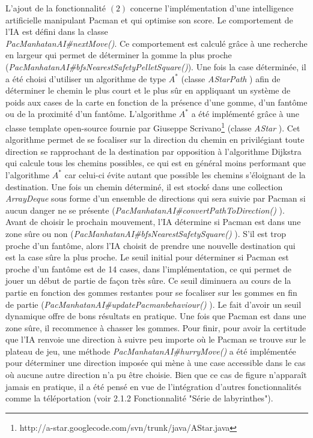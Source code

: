\documentclass[12pt, openany]{report}
\begin{document}
L'ajout de la fonctionnalité $(2)$ concerne l'implémentation d'une intelligence artificielle manipulant Pacman et qui optimise son score. Le comportement de l'IA est défini dans la classe\\
 \mbox{\textit{PacManhatanAI\#nextMove()}}. Ce comportement est calculé grâce à une recherche en largeur qui permet de déterminer la gomme la plus proche (\mbox{\textit{PacManhatanAI\#bfsNearestSafetyPelletSquare()}}). Une fois la case déterminée, il a été choisi d'utiliser un algorithme de type $A^*$ (classe \mbox{\textit{AStarPath}}
) afin de déterminer le chemin le plus court et le plus sûr en appliquant un système de poids aux cases de la carte en fonction de la présence d'une gomme, d'un fantôme ou de la proximité d'un fantôme. L'algorithme $A^*$ a été implémenté grâce à une classe template open-source fournie par Giuseppe Scrivano\footnote{http://a-star.googlecode.com/svn/trunk/java/AStar.java}
(classe \mbox{\textit{AStar}}
). Cet algorithme permet de se focaliser sur la direction du chemin en privilégiant toute direction se rapprochant de la destination par opposition à l'algorithme Dijkstra qui calcule tous les chemins possibles, ce qui est en général moins performant que l'algorithme $A^*$ car celui-ci évite autant que possible les chemins s'éloignant de la destination. Une fois un chemin déterminé, il est stocké dans une collection \textit{ArrayDeque} sous forme d'un ensemble de directions qui sera suivie par Pacman si aucun danger ne se présente (\mbox{\textit{PacManhatanAI\#convertPathToDirection()}}
). Avant de choisir le prochain mouvement, l'IA détermine si Pacman est dans une zone sûre ou non (\mbox{\textit{PacManhatanAI\#bfsNearestSafetySquare()}}
). S'il est trop proche d'un fantôme, alors l'IA choisit de prendre une nouvelle destination qui est la case sûre la plus proche. Le seuil initial pour déterminer si Pacman est proche d'un fantôme est de 14 cases, dans l'implémentation, ce qui permet de jouer un début de partie de façon très sûre. Ce seuil diminuera au cours de la partie en fonction des gommes restantes pour se focaliser sur les gommes en fin de partie (\mbox{\textit{PacManhatanAI\#updatePacmanbehaviour()}}
). Le fait d'avoir un seuil dynamique offre de bons résultats en pratique. Une fois que Pacman est dans une zone sûre, il recommence à chasser les gommes. Pour finir, pour avoir la certitude que l'IA renvoie une direction à suivre peu importe où le Pacman se trouve sur le plateau de jeu, une méthode \mbox{\textit{PacManhatanAI\#hurryMove()}}
a été implémentée pour déterminer une direction imposée qui mène à une case accessible dans le cas où aucune autre direction n'a pu être choisie. Bien que ce cas de figure n'apparaît jamais en pratique, il a été pensé en vue de l'intégration d'autres fonctionnalités comme la téléportation (voir 2.1.2 Fonctionnalité "Série de labyrinthes").
\end{document}
